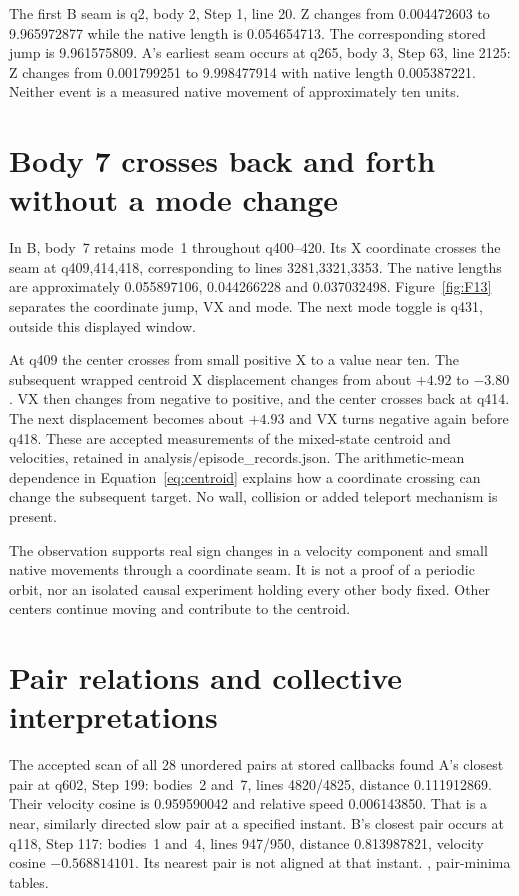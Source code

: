 The first B seam is q2, body 2, Step 1, line 20. Z changes from
0.004472603 to 9.965972877 while the native length is 0.054654713.
The corresponding stored jump is 9.961575809.
A's earliest seam occurs at q265, body 3, Step 63, line 2125:
Z changes from 0.001799251 to 9.998477914 with native length
0.005387221. Neither event is a measured native movement of
approximately ten units. 

\section{Body 7 crosses back and forth without a mode change}
In B, body~7 retains mode~1 throughout q400--420. Its X coordinate
crosses the seam at q409,414,418, corresponding to lines
3281,3321,3353. The native lengths are approximately
0.055897106, 0.044266228 and 0.037032498.
Figure~\ref{fig:F13} separates the coordinate jump, VX and mode.
The next mode toggle is q431, outside this displayed window.

At q409 the center crosses from small positive X to a value near ten.
The subsequent wrapped centroid X displacement changes from about
$+4.92$ to $-3.80$. VX then changes from negative to positive,
and the center crosses back at q414. The next displacement becomes
about $+4.93$ and VX turns negative again before q418.
These are accepted measurements of the mixed-state centroid and
velocities, retained in analysis/episode\_records.json.
The arithmetic-mean dependence in Equation~\eqref{eq:centroid}
explains how a coordinate crossing can change the subsequent target.
No wall, collision or added teleport mechanism is present.

The observation supports real sign changes in a velocity component
and small native movements through a coordinate seam. It is not
a proof of a periodic orbit, nor an isolated causal experiment
holding every other body fixed. Other centers continue moving and
contribute to the centroid. 

\section{Pair relations and collective interpretations}
The accepted scan of all 28 unordered pairs at stored callbacks
found A's closest pair at q602, Step 199: bodies~2 and~7,
lines 4820/4825, distance 0.111912869. Their velocity cosine is
0.959590042 and relative speed 0.006143850. That is a near,
similarly directed slow pair at a specified instant.
B's closest pair occurs at q118, Step 117: bodies~1 and~4,
lines 947/950, distance 0.813987821, velocity cosine
$-0.568814101$. Its nearest pair is not aligned at that instant.
\cite{study03}, pair-minima tables. 

